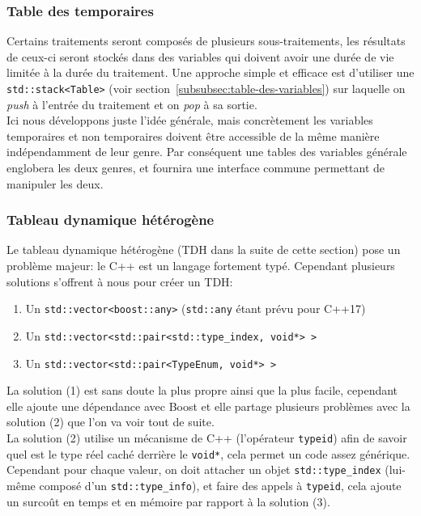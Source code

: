 \documentclass[french]{article}
\begin{document}
			\subsubsection{Table des temporaires}
				\label{subsubsec:table-des-temporaires}
				Certains traitements seront composés de plusieurs sous-traitements, les résultats de ceux-ci seront stockés dans des variables qui doivent avoir une durée de vie limitée à la durée du traitement. Une approche simple et efficace est d'utiliser une \texttt{std::stack<Table>} (voir section~\ref{subsubsec:table-des-variables}) sur laquelle on \textit{push} à l'entrée du traitement et on \textit{pop} à sa sortie.\\
				
				Ici nous développons juste l'idée générale, mais concrètement les variables temporaires et non temporaires doivent être accessible de la même manière indépendamment de leur genre. Par conséquent une tables des variables générale englobera les deux genres, et fournira une interface commune permettant de manipuler les deux.
				
			\subsubsection{Tableau dynamique hétérogène}
				\label{subsubsec:tableau-dynamique-heterogene}
				Le tableau dynamique hétérogène (TDH dans la suite de cette section) pose un problème majeur: le C++ est un langage fortement typé. Cependant plusieurs solutions s'offrent à nous pour créer un TDH:
				
				\begin{enumerate}
					\item Un \texttt{std::vector<boost::any>} (\texttt{std::any} étant prévu pour C++17)
					\item Un \texttt{std::vector<std::pair<std::type\_index, void*> >}
					\item Un \texttt{std::vector<std::pair<TypeEnum, void*> >}
				\end{enumerate}
				
				La solution (1) est sans doute la plus propre ainsi que la plus facile, cependant elle ajoute une dépendance avec Boost et elle partage plusieurs problèmes avec la solution (2) que l'on va voir tout de suite.\\
				
				La solution (2) utilise un mécanisme de C++ (l'opérateur \texttt{typeid}) afin de savoir quel est le type réel caché derrière le \texttt{void*}, cela permet un code assez générique. Cependant pour chaque valeur, on doit attacher un objet \texttt{std::type\_index} (lui-même composé d'un \texttt{std::type\_info}), et faire des appels à \texttt{typeid}, cela ajoute un surcoût en temps et en mémoire par rapport à la solution (3).\\
				
\end{document}
